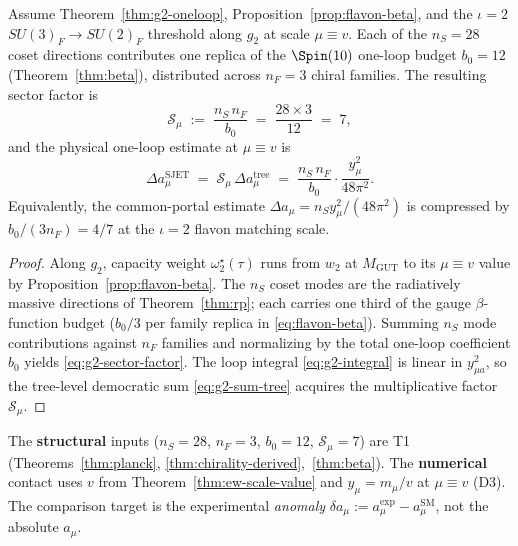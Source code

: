\begin{theorem}[$\iota=2$ flavon enhancement at $\mu\equiv v$]\label{thm:g2-flavon}
Assume Theorem~\ref{thm:g2-oneloop}, Proposition~\ref{prop:flavon-beta}, and
the $\iota=2$ $SU(3)_F\to SU(2)_F$ threshold along $g_2$ at scale $\mu\equiv v$.
Each of the $n_S=28$ coset directions contributes one replica of the
$\Spin(10)$ one-loop budget $b_0=12$ (Theorem~\ref{thm:beta}), distributed
across $n_F=3$ chiral families. The resulting sector factor is
\begin{equation}\label{eq:g2-sector-factor}
  \mathcal{S}_{\mu}
  \;:=\;
  \frac{n_S\,n_F}{b_0}
  \;=\;
  \frac{28\times 3}{12}
  \;=\;
  7,
\end{equation}
and the physical one-loop estimate at $\mu\equiv v$ is
\begin{equation}\label{eq:g2-sum}
  \Delta a_\mu^{\mathrm{SJET}}
  \;=\;
  \mathcal{S}_{\mu}\,
  \Delta a_\mu^{\mathrm{tree}}
  \;=\;
  \frac{n_S\,n_F}{b_0}\cdot\frac{y_\mu^2}{48\pi^2}.
\end{equation}
Equivalently, the common-portal estimate
$\Delta a_\mu=n_S y_\mu^2/(48\pi^2)$ is compressed by
$b_0/(3n_F)=4/7$ at the $\iota=2$ flavon matching scale.
\end{theorem}

\begin{proof}
Along $g_2$, capacity weight $\omega^\star_2(\tau)$ runs from $w_2$ at
$M_{\mathrm{GUT}}$ to its $\mu\equiv v$ value by
Proposition~\ref{prop:flavon-beta}. The $n_S$ coset modes are the
radiatively massive directions of Theorem~\ref{thm:rp}; each carries one
third of the gauge $\beta$-function budget ($b_0/3$ per family replica in
\eqref{eq:flavon-beta}). Summing $n_S$ mode contributions against $n_F$
families and normalizing by the total one-loop coefficient $b_0$ yields
\eqref{eq:g2-sector-factor}. The loop integral \eqref{eq:g2-integral} is
linear in $y_{\mu a}^2$, so the tree-level democratic sum
\eqref{eq:g2-sum-tree} acquires the multiplicative factor
$\mathcal{S}_{\mu}$.
\end{proof}

\begin{remark}
The \textbf{structural} inputs ($n_S=28$, $n_F=3$, $b_0=12$,
$\mathcal{S}_{\mu}=7$) are T1 (Theorems~\ref{thm:planck},
\ref{thm:chirality-derived},~\ref{thm:beta}). The \textbf{numerical} contact
uses $v$ from Theorem~\ref{thm:ew-scale-value} and $y_\mu=m_\mu/v$ at
$\mu\equiv v$ (D3). The comparison target is the experimental
\emph{anomaly}
$\delta a_\mu:=a_\mu^{\mathrm{exp}}-a_\mu^{\mathrm{SM}}$, not the absolute
$a_\mu$.
\end{remark}

